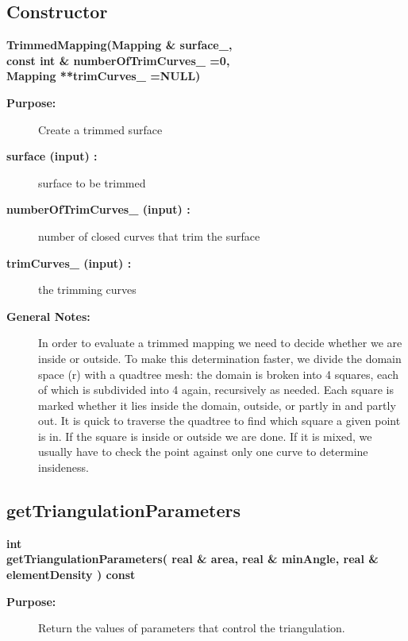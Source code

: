 \subsection{Constructor}
 
\begin{flushleft} \textbf{%
\settowidth{\TrimmedMappingIncludeArgIndent}{TrimmedMapping(}%
TrimmedMapping(Mapping \& surface\_, \\ 
\hspace{\TrimmedMappingIncludeArgIndent}const int \& numberOfTrimCurves\_  =0, \\ 
\hspace{\TrimmedMappingIncludeArgIndent}Mapping **trimCurves\_  =NULL)
}\end{flushleft}
\begin{description}
\item[{\bf Purpose:}]  Create a trimmed surface
\item[{\bf surface (input) :}]  surface to be trimmed
\item[{\bf numberOfTrimCurves\_ (input) :}]  number of closed curves that trim the surface
\item[{\bf trimCurves\_ (input) :}]  the trimming curves 
\item[{\bf General Notes:}] 
    In order to evaluate a trimmed mapping we need to decide whether we are inside or outside.
  To make this determination faster, we divide the domain space (r) with a quadtree mesh:
 the domain is broken into 4 squares, each of which is subdivided into 4 again, recursively
 as needed.  Each square is marked whether it lies inside the domain, outside, or partly in
 and partly out.  It is quick to traverse the quadtree to find which square a given point is
 in.  If the square is inside or outside we are done.  If it is mixed, we usually have to
 check the point against only one curve to determine insideness.

\end{description}
\subsection{getTriangulationParameters}
 
\begin{flushleft} \textbf{%
int  \\ 
\settowidth{\TrimmedMappingIncludeArgIndent}{getTriangulationParameters(}%
getTriangulationParameters( real \& area, real \& minAngle, real \& elementDensity ) const
}\end{flushleft}
\begin{description}
\item[{\bf Purpose:}]  
    Return the values of parameters that control the triangulation.
\end{description}
